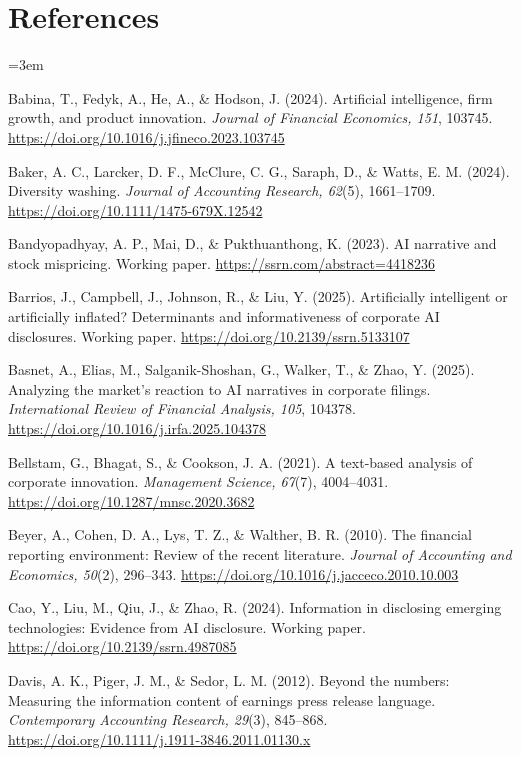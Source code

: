 \clearpage
\section*{References}

\begingroup
\small
\raggedright
\setlength{\parindent}{0pt}
\setlength{\parskip}{0.6em}
\emergencystretch=3em
\sloppy

Babina, T., Fedyk, A., He, A., \& Hodson, J. (2024). Artificial intelligence, firm growth, and product innovation. \textit{Journal of Financial Economics, 151}, 103745. \url{https://doi.org/10.1016/j.jfineco.2023.103745}

Baker, A. C., Larcker, D. F., McClure, C. G., Saraph, D., \& Watts, E. M. (2024). Diversity washing. \textit{Journal of Accounting Research, 62}(5), 1661--1709. \url{https://doi.org/10.1111/1475-679X.12542}

Bandyopadhyay, A. P., Mai, D., \& Pukthuanthong, K. (2023). AI narrative and stock mispricing. Working paper. \url{https://ssrn.com/abstract=4418236}

Barrios, J., Campbell, J., Johnson, R., \& Liu, Y. (2025). Artificially intelligent or artificially inflated? Determinants and informativeness of corporate AI disclosures. Working paper. \url{https://doi.org/10.2139/ssrn.5133107}

Basnet, A., Elias, M., Salganik-Shoshan, G., Walker, T., \& Zhao, Y. (2025). Analyzing the market's reaction to AI narratives in corporate filings. \textit{International Review of Financial Analysis, 105}, 104378. \url{https://doi.org/10.1016/j.irfa.2025.104378}

Bellstam, G., Bhagat, S., \& Cookson, J. A. (2021). A text-based analysis of corporate innovation. \textit{Management Science, 67}(7), 4004--4031. \url{https://doi.org/10.1287/mnsc.2020.3682}

Beyer, A., Cohen, D. A., Lys, T. Z., \& Walther, B. R. (2010). The financial reporting environment: Review of the recent literature. \textit{Journal of Accounting and Economics, 50}(2), 296--343. \url{https://doi.org/10.1016/j.jacceco.2010.10.003}

Cao, Y., Liu, M., Qiu, J., \& Zhao, R. (2024). Information in disclosing emerging technologies: Evidence from AI disclosure. Working paper. \url{https://doi.org/10.2139/ssrn.4987085}

Davis, A. K., Piger, J. M., \& Sedor, L. M. (2012). Beyond the numbers: Measuring the information content of earnings press release language. \textit{Contemporary Accounting Research, 29}(3), 845--868. \url{https://doi.org/10.1111/j.1911-3846.2011.01130.x}

